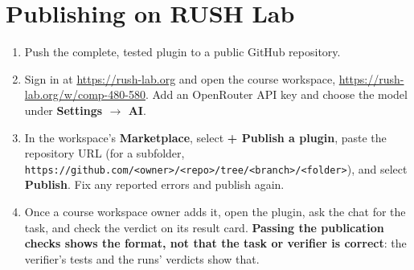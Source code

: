 \section{Publishing on RUSH Lab}

\begin{enumerate}
  \item Push the complete, tested plugin to a public GitHub repository.
  \item Sign in at \url{https://rush-lab.org} and open the course workspace,
    \url{https://rush-lab.org/w/comp-480-580}. Add an OpenRouter API key and
    choose the model under \textbf{Settings $\rightarrow$ AI}.
  \item In the workspace's \textbf{Marketplace}, select \textbf{+ Publish a plugin}, paste
    the repository URL (for a subfolder,
    \nolinkurl{https://github.com/<owner>/<repo>/tree/<branch>/<folder>}),
    and select \textbf{Publish}. Fix any reported errors and publish again.
  \item Once a course workspace owner adds it, open the plugin, ask the chat for the
    task, and check the verdict on its result card. \textbf{Passing the
    publication checks shows the format, not that the task or verifier is
    correct}: the verifier's tests and the runs' verdicts show that.
\end{enumerate}
